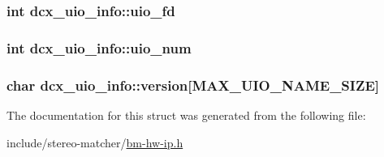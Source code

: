 \subsubsection[{\texorpdfstring{uio\+\_\+fd}{uio_fd}}]{\setlength{\rightskip}{0pt plus 5cm}int dcx\+\_\+uio\+\_\+info\+::uio\+\_\+fd}\hypertarget{structdcx__uio__info_a2ebe1bdd70d7c34232ea3f85c1d591d3}{}\label{structdcx__uio__info_a2ebe1bdd70d7c34232ea3f85c1d591d3}
\subsubsection[{\texorpdfstring{uio\+\_\+num}{uio_num}}]{\setlength{\rightskip}{0pt plus 5cm}int dcx\+\_\+uio\+\_\+info\+::uio\+\_\+num}\hypertarget{structdcx__uio__info_a02e1b0caf53d192f1d50de34f63d55a0}{}\label{structdcx__uio__info_a02e1b0caf53d192f1d50de34f63d55a0}
\subsubsection[{\texorpdfstring{version}{version}}]{\setlength{\rightskip}{0pt plus 5cm}char dcx\+\_\+uio\+\_\+info\+::version\mbox{[}{\bf M\+A\+X\+\_\+\+U\+I\+O\+\_\+\+N\+A\+M\+E\+\_\+\+S\+I\+ZE}\mbox{]}}\hypertarget{structdcx__uio__info_ae1be148e26467d078ca0383c16f76a41}{}\label{structdcx__uio__info_ae1be148e26467d078ca0383c16f76a41}


The documentation for this struct was generated from the following file\+:\begin{DoxyCompactItemize}
\item 
include/stereo-\/matcher/\hyperlink{bm-hw-ip_8h}{bm-\/hw-\/ip.\+h}\end{DoxyCompactItemize}
